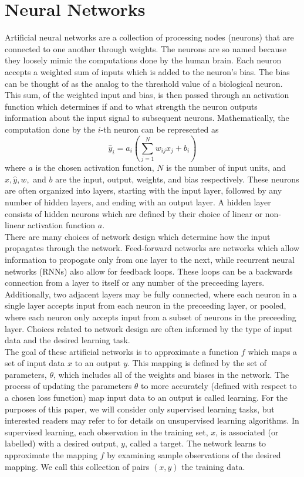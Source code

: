 \documentclass[12pt]{article}
\begin{document}
\section{Neural Networks}
\indent Artificial neural networks are a collection of processing nodes (neurons) that are connected to one another through weights. The neurons are so named because they loosely mimic the computations done by the human brain. Each neuron accepts a weighted sum of inputs which is added to the neuron's bias. The bias can be thought of as the analog to the threshold value of a biological neuron. This sum, of the weighted input and bias, is then passed through an activation function which determines if and to what strength the neuron outputs information about the input signal to subsequent neurons. Mathematically, the computation done by the $i$-th neuron can be represented as
\begin{equation}
  \hat y_i = a_i(\sum_{j=1}^N w_{ij}x_j + b_i)
  \label{eq:unit}
\end{equation}
where $a$ is the chosen activation function, $N$ is the number of input units, and $x,\hat y,w,$ and $b$ are the input, output, weights, and bias respectively. These neurons are often organized into layers, starting with the input layer, followed by any number of hidden layers, and ending with an output layer. A hidden layer consists of hidden neurons which are defined by their choice of linear or non-linear activation function $a$.  \\
\indent There are many choices of network design which determine how the input propagates through the network. Feed-forward networks are networks which allow information to propogate only from one layer to the next, while recurrent neural networks (RNNs) also allow for feedback loops. These loops can be a backwards connection from a layer to itself or any number of the preceeding layers. Additionally, two adjacent layers may be fully connected, where each neuron in a single layer accepts input from each neuron in the preceeding layer, or pooled, where each neuron only accepts input from a subset of neurons in the preceeding layer. Choices related to network design are often informed by the type of input data and the desired learning task. \\
\indent The goal of these artificial networks is to approximate a function $f$ which maps a set of input data $x$ to an output $y$. This mapping is defined by the set of parameters, $\theta$, which includes all of the weights and biases in the network. The process of updating the parameters $\theta$ to more accurately (defined with respect to a chosen loss function) map input data to an output is called learning. For the purposes of this paper, we will consider only supervised learning tasks, but interested readers may refer to \cite{bengio} for details on unsupervised learning algorithms. In supervised learning, each observation in the training set, $x$, is associated (or labelled) with a desired output, $y$, called a target. The network learns to approximate the mapping $f$ by examining sample observations of the desired mapping. We call this collection of pairs $(x,y)$ the training data. \\
\end{document}
